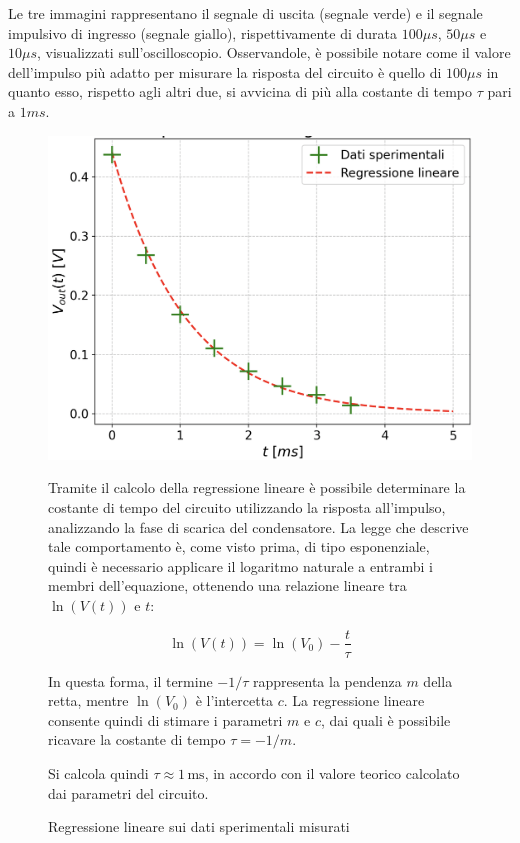 Le tre immagini rappresentano il segnale di uscita (segnale verde) e il segnale impulsivo di ingresso (segnale giallo), rispettivamente di durata $100 \mu s$, $50 \mu s$ e $10 \mu s$, visualizzati sull’oscilloscopio. Osservandole, è possibile notare come il valore dell’impulso più adatto per misurare la risposta del circuito è quello di $100 \mu s$ in quanto esso, rispetto agli altri due, si avvicina di più alla costante di tempo $\tau$ pari a $1 ms$.

\begin{figure}[h]
    \centering
    \begin{minipage}{0.5\textwidth}
        \centering
        \includegraphics[width=0.8\linewidth]{es2.png}
        \caption{Regressione lineare sui dati sperimentali misurati}
        \label{fig:enter-label}
    \end{minipage}%
    \begin{minipage}{0.5\textwidth}
        \centering
        Tramite il calcolo della regressione lineare è possibile determinare la costante di tempo del circuito utilizzando la risposta all’impulso, analizzando la fase di scarica del condensatore. La legge che descrive tale comportamento è, come visto prima, di tipo esponenziale, quindi è necessario applicare il logaritmo naturale a entrambi i membri dell’equazione, ottenendo una relazione lineare tra $\ln(V(t))$ e $t$:

        $$\ln(V(t)) = \ln(V_0) - \frac{t}{\tau}$$

        In questa forma, il termine $-1/\tau$ rappresenta la pendenza $m$ della retta, mentre $\ln(V_0)$ è l’intercetta $c$. La regressione lineare consente quindi di stimare i parametri $m$ e $c$, dai quali è possibile ricavare la costante di tempo $\tau = -1/m$.

        Si calcola quindi $\tau \approx 1 \,\text{ms}$, in accordo con il valore teorico calcolato dai parametri del circuito.
    \end{minipage}
\end{figure}



